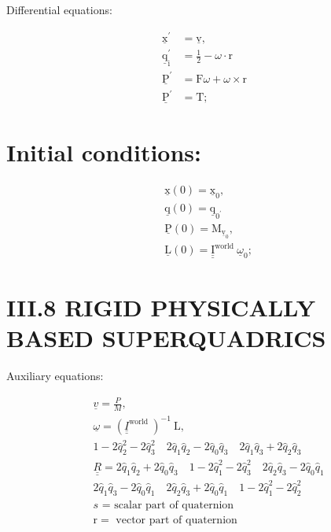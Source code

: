 Differential equations:

$$
\begin{aligned}
\underline{\mathrm{x}}^{\mathrm{\prime}} &=\underline{\mathrm{v}}, \\
\underline{\mathrm{q}}_{\mathrm{i}}^{\prime} &=\frac{1}{2}-\omega \cdot \mathrm{r} \\
\underline{\mathrm{P}}^{\prime} &=\mathrm{F} \omega+\omega \times \mathrm{r} \\
\underline{\mathrm{P}}^{\prime} &=\mathrm{T} ;
\end{aligned}
$$

\section{Initial conditions:}
$$
\begin{aligned}
&\underline{\mathrm{x}}(0)=\underline{\mathrm{x}}_{0}, \\
&\underline{\mathrm{q}}(0)=\underline{\mathrm{q}}_{0^{\prime}} \\
&\underline{\mathrm{P}}(0)=\mathrm{M}_{\underline{\mathrm{v}}_{0}}, \\
&\underline{\mathrm{L}}(0)=\underline{\underline{\mathrm{I}}}^{\text {world }} \underline{\omega}_{0} ;
\end{aligned}
$$

\section{III.8 RIGID PHYSICALLY BASED SUPERQUADRICS}
Auxiliary equations:

$$
\begin{aligned}
& \underline{v}=\frac{P}{M} \text {, } \\
& \underline{\omega}=\left(\underline{\underline{I}}^{\text {world }}\right)^{-1} \mathrm{~L}, \\
& 1-2 \hat{q}_{2}^{2}-2 \hat{q}_{3}^{2} \quad 2 \hat{q}_{1} \hat{q}_{2}-2 \hat{q}_{0} \hat{q}_{3} \quad 2 \hat{q}_{1} \hat{q}_{3}+2 \hat{q}_{2} \hat{q}_{3} \\
& \underline{\underline{R}}=2 \hat{q}_{1} \hat{q}_{2}+2 \hat{q}_{0} \hat{q}_{3} \quad 1-2 \hat{q}_{1}^{2}-2 \hat{q}_{3}^{2} \quad 2 \hat{q}_{2} \hat{q}_{3}-2 \hat{q}_{0} \hat{q}_{1} \\
& 2 \hat{q}_{1} \hat{q}_{3}-2 \hat{q}_{0} \hat{q}_{1} \quad 2 \hat{q}_{2} \hat{q}_{3}+2 \hat{q}_{0} \hat{q}_{1} \quad 1-2 \hat{q}_{1}^{2}-2 \hat{q}_{2}^{2} \\
& s \text { = scalar part of quaternion } \\
& \mathrm{r}=\text { vector part of quaternion }
\end{aligned}
$$

